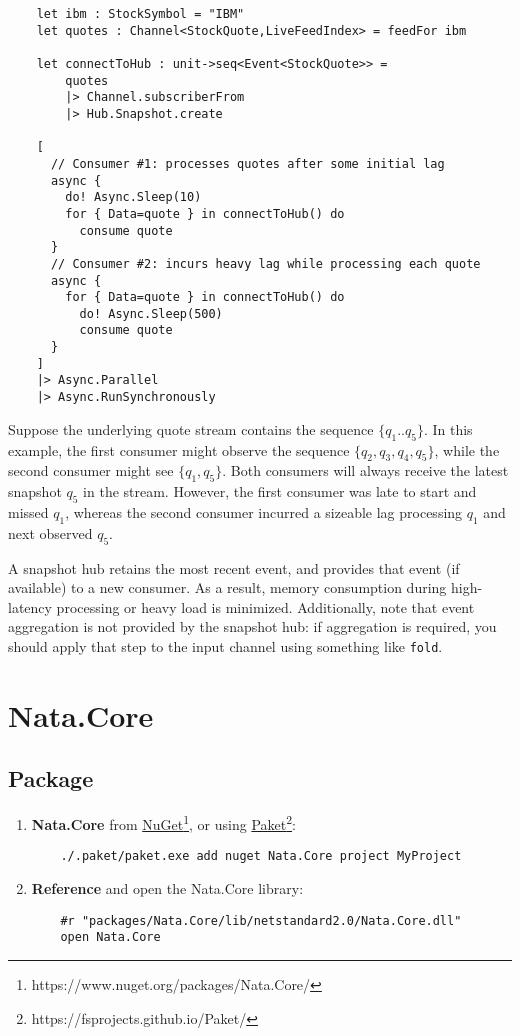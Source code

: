 \documentclass{article}
\begin{document}
\begin{verbatim}
    let ibm : StockSymbol = "IBM"
    let quotes : Channel<StockQuote,LiveFeedIndex> = feedFor ibm

    let connectToHub : unit->seq<Event<StockQuote>> =
        quotes
        |> Channel.subscriberFrom
        |> Hub.Snapshot.create

    [
      // Consumer #1: processes quotes after some initial lag
      async {
        do! Async.Sleep(10)
        for { Data=quote } in connectToHub() do
          consume quote 
      }
      // Consumer #2: incurs heavy lag while processing each quote
      async {
        for { Data=quote } in connectToHub() do
          do! Async.Sleep(500)
          consume quote
      }
    ]
    |> Async.Parallel
    |> Async.RunSynchronously
\end{verbatim}

Suppose the underlying quote stream contains the sequence $\{q_1..q_5\}$. In this example, the first consumer might observe the sequence $\{q_2,q_3,q_4,q_5\}$, while the second consumer might see $\{q_1,q_5\}$. Both consumers will always receive the latest snapshot $q_5$ in the stream.  However, the first consumer was late to start and missed $q_1$, whereas the second consumer incurred a sizeable lag processing $q_1$ and next observed $q_5$.

A snapshot hub retains the most recent event, and provides that event (if available) to a new consumer. As a result, memory consumption during high-latency processing or heavy load is minimized.  Additionally, note that event aggregation is not provided by the snapshot hub: if aggregation is required, you should apply that step to the input channel using something like \texttt{fold}.

\clearpage
\section{Nata.Core}

\subsection{Package}

\begin{enumerate}
    
    \item\textbf{Nata.Core} from \href{https://www.nuget.org/packages/Nata.Core/}{NuGet}\footnote{https://www.nuget.org/packages/Nata.Core/}, or using \href{https://fsprojects.github.io/Paket/}{Paket}\footnote{https://fsprojects.github.io/Paket/}:
    \begin{verbatim}
    ./.paket/paket.exe add nuget Nata.Core project MyProject
    \end{verbatim}
    
    \item\textbf{Reference} and open the Nata.Core library:
    \begin{verbatim}
    #r "packages/Nata.Core/lib/netstandard2.0/Nata.Core.dll"
    open Nata.Core
    \end{verbatim}
\end{enumerate}
\end{document}
